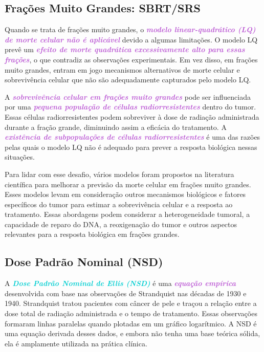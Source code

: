 \documentclass[11pt,a4paper]{article}
\begin{document}
\subsection*{Frações Muito Grandes: SBRT/SRS}

	Quando se trata de frações muito grandes, o \textcolor{MediumOrchid}{\textbf{\textit{modelo linear-quadrático (LQ) de morte celular não é aplicável}}} devido a algumas limitações. O modelo LQ prevê um \textcolor{MediumOrchid}{\textbf{\textit{efeito de morte quadrática excessivamente alto para essas frações}}}, o que contradiz as observações experimentais. Em vez disso, em frações muito grandes, entram em jogo mecanismos alternativos de morte celular e sobrevivência celular que não são adequadamente capturados pelo modelo LQ.

	A \textcolor{MediumOrchid}{\textbf{\textit{sobrevivência celular em frações muito grandes}}} pode ser influenciada por uma \textcolor{MediumOrchid}{\textbf{\textit{pequena população de células radiorresistentes}}} dentro do tumor. Essas células radiorresistentes podem sobreviver à dose de radiação administrada durante a fração grande, diminuindo assim a eficácia do tratamento. A \textcolor{MediumOrchid}{\textbf{\textit{existência de subpopulações de células radiorresistentes}}} é uma das razões pelas quais o modelo LQ não é adequado para prever a resposta biológica nessas situações.

	Para lidar com esse desafio, vários modelos foram propostos na literatura científica para melhorar a previsão da morte celular em frações muito grandes. Esses modelos levam em consideração outros mecanismos biológicos e fatores específicos do tumor para estimar a sobrevivência celular e a resposta ao tratamento. Essas abordagens podem considerar a heterogeneidade tumoral, a capacidade de reparo do DNA, a reoxigenação do tumor e outros aspectos relevantes para a resposta biológica em frações grandes.

\subsection*{Dose Padrão Nominal (NSD)}

	A \textcolor{DarkTurquoise}{\textbf{\textit{Dose Padrão Nominal de Ellis (NSD)}}} é uma \textcolor{MediumOrchid}{\textbf{\textit{equação empírica}}} desenvolvida com base nas observações de Strandquist nas décadas de 1930 e 1940. Strandquist tratou pacientes com câncer de pele e traçou a relação entre a dose total de radiação administrada e o tempo de tratamento. Essas observações formaram linhas paralelas quando plotadas em um gráfico logarítmico. A NSD é uma equação derivada desses dados, e embora não tenha uma base teórica sólida, ela é amplamente utilizada na prática clínica.
\end{document}
